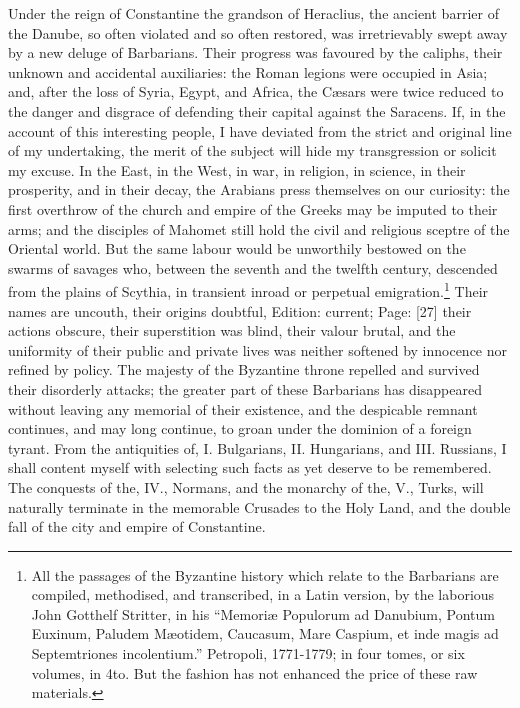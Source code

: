 Under the reign of Constantine the grandson of Heraclius, the ancient barrier of the Danube, so often violated and so often restored, was irretrievably swept away by a new deluge of Barbarians. Their progress was favoured by the caliphs, their unknown and accidental auxiliaries: the Roman legions were occupied in Asia; and, after the loss of Syria, Egypt, and Africa, the Cæsars were twice reduced to the danger and disgrace of defending their capital against the Saracens. If, in the account of this interesting people, I have deviated from the strict and original line of my undertaking, the merit of the subject will hide my transgression or solicit my excuse. In the East, in the West, in war, in religion, in science, in their prosperity, and in their decay, the Arabians press themselves on our curiosity: the first overthrow of the church and empire of the Greeks may be imputed to their arms; and the disciples of Mahomet still hold the civil and religious sceptre of the Oriental world. But the same labour would be unworthily bestowed on the swarms of savages who, between the seventh and the twelfth century, descended from the plains of Scythia, in transient inroad or perpetual emigration.\footnote{All the passages of the Byzantine history which relate to the Barbarians are compiled, methodised, and transcribed, in a Latin version, by the laborious John Gotthelf Stritter, in his \texthebrew{“}Memoriæ Populorum ad Danubium, Pontum Euxinum, Paludem Mæotidem, Caucasum, Mare Caspium, et inde magis ad Septemtriones incolentium.\texthebrew{}” Petropoli, 1771-1779; in four tomes, or six volumes, in 4to. But the fashion has not enhanced the price of these raw materials.} Their names are uncouth, their origins doubtful, Edition: current; Page: [27] their actions obscure, their superstition was blind, their valour brutal, and the uniformity of their public and private lives was neither softened by innocence nor refined by policy. The majesty of the Byzantine throne repelled and survived their disorderly attacks; the greater part of these Barbarians has disappeared without leaving any memorial of their existence, and the despicable remnant continues, and may long continue, to groan under the dominion of a foreign tyrant. From the antiquities of, I. Bulgarians, II. Hungarians, and III. Russians, I shall content myself with selecting such facts as yet deserve to be remembered. The conquests of the, IV., Normans, and the monarchy of the, V., Turks, will naturally terminate in the memorable Crusades to the Holy Land, and the double fall of the city and empire of Constantine.


